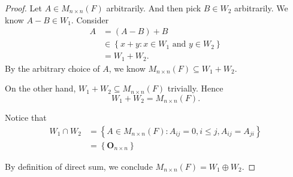 \begin{Exercise}
	\begin{proof}
		Let $A\in M_{n\times n}(F)$ arbitrarily. And then pick $B\in W_2$ arbitrarily. We know $A-B\in W_1$. Consider
		\begin{align*}
			A 
			&= (A-B) + B \\
			&\in \left\{ x+y:x\in W_1\text{ and }y\in W_2 \right\} \\
			&= W_1+W_2.
		\end{align*}
		By the arbitrary choice of $A$, we know $M_{n\times n}(F)\subseteq W_1+W_2$.
		
		On the other hand, $W_1+W_2\subseteq M_{n\times n}(F)$ trivially. Hence 
		$$
		W_1+W_2 = M_{n\times n}(F).
		$$
		
		Notice that
		\begin{align*}
			W_1\cap W_2
			&= \left\{ A\in M_{n\times n}(F):A_{i j}=0, i\leq j, A_{i j} = A_{j i} \right\} \\
			&= \left\{ \mathbf{O}_{n\times n} \right\}
		\end{align*}
		
		By definition of direct sum, we conclude $M_{n\times n}(F) = W_1\oplus W_2$.
	\end{proof}
\end{Exercise}